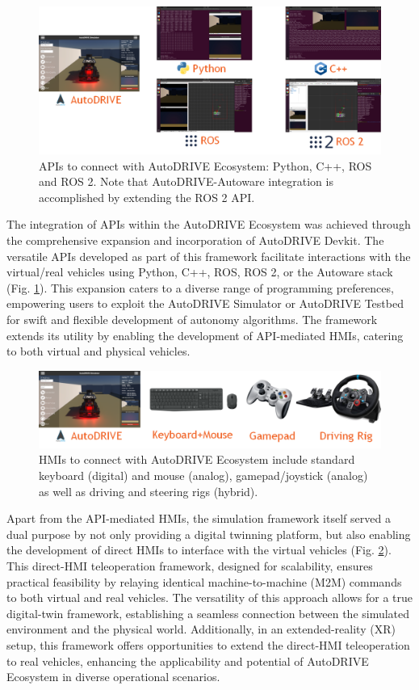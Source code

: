 \begin{figure}[h]
    \centering
    \includegraphics[width=\linewidth]{Figures/fig10.png}
    \caption{APIs to connect with AutoDRIVE Ecosystem: Python, C++, ROS and ROS 2. Note that AutoDRIVE-Autoware integration is accomplished by extending the ROS 2 API.}
    \label{fig: figure10}
\end{figure}

The integration of APIs within the AutoDRIVE Ecosystem was achieved through the comprehensive expansion and incorporation of AutoDRIVE Devkit. The versatile APIs developed as part of this framework facilitate interactions with the virtual/real vehicles using Python, C++, ROS, ROS 2, or the Autoware stack (Fig. \ref{fig: figure10}). This expansion caters to a diverse range of programming preferences, empowering users to exploit the AutoDRIVE Simulator or AutoDRIVE Testbed for swift and flexible development of autonomy algorithms. The framework extends its utility by enabling the development of API-mediated HMIs, catering to both virtual and physical vehicles.

\begin{figure}[t]
    \centering
    \includegraphics[width=\linewidth]{Figures/fig11.png}
    \caption{HMIs to connect with AutoDRIVE Ecosystem include standard keyboard (digital) and mouse (analog), gamepad/joystick (analog) as well as driving and steering rigs (hybrid).}
    \label{fig: figure11}
\end{figure}

Apart from the API-mediated HMIs, the simulation framework itself served a dual purpose by not only providing a digital twinning platform, but also enabling the development of direct HMIs to interface with the virtual vehicles (Fig. \ref{fig: figure11}). This direct-HMI teleoperation framework, designed for scalability, ensures practical feasibility by relaying identical machine-to-machine (M2M) commands to both virtual and real vehicles. The versatility of this approach allows for a true digital-twin framework, establishing a seamless connection between the simulated environment and the physical world. Additionally, in an extended-reality (XR) setup, this framework offers opportunities to extend the direct-HMI teleoperation to real vehicles, enhancing the applicability and potential of AutoDRIVE Ecosystem in diverse operational scenarios.